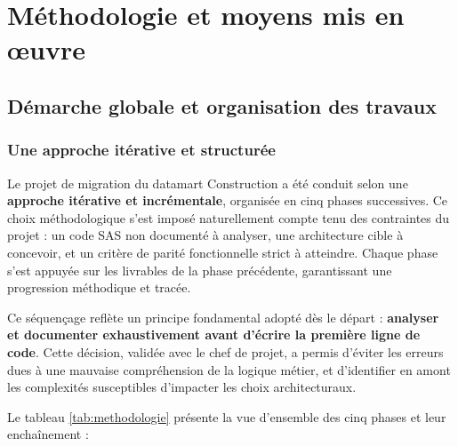 \chapter{Méthodologie et moyens mis en œuvre}

\section{Démarche globale et organisation des travaux}

\subsection{Une approche itérative et structurée}

Le projet de migration du datamart Construction a été conduit selon une \textbf{approche itérative et incrémentale}, organisée en cinq phases successives. Ce choix méthodologique s'est imposé naturellement compte tenu des contraintes du projet : un code SAS non documenté à analyser, une architecture cible à concevoir, et un critère de parité fonctionnelle strict à atteindre. Chaque phase s'est appuyée sur les livrables de la phase précédente, garantissant une progression méthodique et tracée.

Ce séquençage reflète un principe fondamental adopté dès le départ : \textbf{analyser et documenter exhaustivement avant d'écrire la première ligne de code}. Cette décision, validée avec le chef de projet, a permis d'éviter les erreurs dues à une mauvaise compréhension de la logique métier, et d'identifier en amont les complexités susceptibles d'impacter les choix architecturaux.

Le tableau \ref{tab:methodologie} présente la vue d'ensemble des cinq phases et leur enchaînement :

